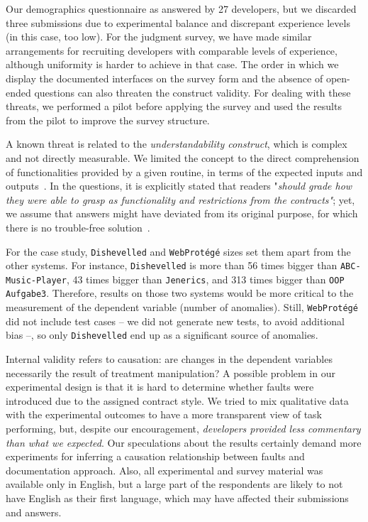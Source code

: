 Our demographics questionnaire as answered by 27 developers, but we discarded three submissions due to experimental balance and discrepant experience levels (in this case, too low).
For the judgment survey, we have made similar arrangements for recruiting developers with comparable levels of experience, although uniformity is harder to achieve in that case.
The order in which we display the documented
interfaces on the survey form and the absence of open-ended questions can also threaten the construct validity. For dealing with these threats, we
performed a pilot before applying the survey and used the results from the pilot to improve the survey structure. 


A known threat is related to the \emph{understandability construct}, which is complex and not directly measurable. We limited the concept to the direct comprehension of functionalities provided by a given routine, in terms of the expected inputs and outputs~\cite{4019969}. In the questions, it is explicitly stated that readers "\emph{should grade how they were able to grasp as functionality and restrictions from the contracts"}; yet, we assume that answers might have deviated from its original purpose, for which there is no trouble-free solution~\cite{Scalabrino2017}.



For the case study, \texttt{Dishevelled} and
\texttt{WebProt\'{e}g\'{e}} sizes set them apart from the other systems.
For instance, \texttt{Dishevelled} is more than 56 times bigger than \texttt{ABC-Music-Player}, 43
times bigger than \texttt{Jenerics}, and 313 times bigger than \texttt{OOP Aufgabe3}.
Therefore, results on those two systems would be more critical to the measurement of the dependent variable (number of anomalies).
Still, \texttt{WebProt\'{e}g\'{e}} did not include test cases -- we did not generate new tests, to avoid additional bias --, so only \texttt{Dishevelled} end up as a significant source of anomalies.


Internal validity refers to causation: are changes in the dependent variables necessarily the result of treatment manipulation? A possible problem in our experimental design is that it is hard to determine whether faults were introduced due to the assigned contract style. We tried to mix qualitative data with the experimental outcomes to have a more transparent view of task performing, but, despite our encouragement, \emph{developers provided less commentary than what we expected}. Our speculations about the results certainly demand more experiments for inferring a causation relationship between faults and documentation approach.
Also, all experimental and survey material was available only in English, but a large part of the respondents are likely to not have English as their first language, which may have affected their
submissions and answers.

